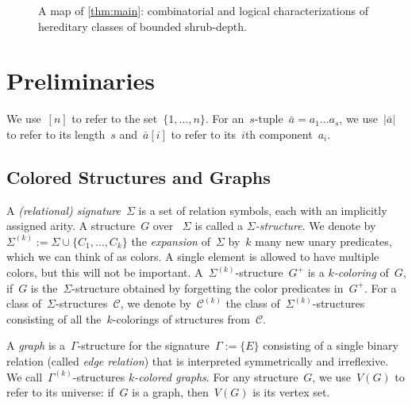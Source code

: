 \documentclass[11pt]{article}      \usepackage[margin=1in]{geometry}  \usepackage{microtype}
\theoremstyle{definition}
\newcommand{\CC}{\mathcal{C}}
\begin{document}
\begin{figure}[ht]
{      
}
\caption{A map of \cref{thm:main}: combinatorial and logical characterizations of hereditary classes of bounded shrub-depth.}
\label{fig:implications}
\end{figure}

  
\section{Preliminaries}\label{sec:prelims}
We use~$[n]$ to refer to the set~$\{ 1,\ldots,n \}$.
For an~$s$-tuple~$\bar a = a_1 \ldots a_s$, we use~$|\bar a|$ to refer to its length~$s$ and~$\bar a[i]$ to refer to its~$i$th component~$a_i$.

\subsection{Colored Structures and Graphs}
A \emph{(relational) signature}~$\Sigma$ is a set of relation symbols, each with an implicitly assigned arity.
A structure~$G$ over ~$\Sigma$ is called a \emph{$\Sigma$-structure}.
We denote by~$\Sigma^{(k)} := \Sigma \cup \{C_1,\ldots,C_k\}$ the \emph{expansion} of~$\Sigma$ by~$k$ many new unary predicates, which we can think of as colors.
A single element is allowed to have multiple colors, but this will not be important.
A~$\Sigma^{(k)}$-structure~$G^+$ is a \emph{$k$-coloring} of~$G$, if~$G$ is the~$\Sigma$-structure obtained by forgetting the color predicates in~$G^+$.
For a class of~$\Sigma$-structures~$\CC$, we denote by~$\CC^{(k)}$ the class of~$\Sigma^{(k)}$-structures consisting of all the~$k$-colorings of structures from~$\CC$.

A \emph{graph} is a~$\Gamma$-structure for the signature~$\Gamma := \{E\}$ consisting of a single binary relation (called \emph{edge relation}) that is interpreted symmetrically and irreflexive.
We call~$\Gamma^{(k)}$-structures \emph{$k$-colored graphs}.
For any structure~$G$, we use~$V(G)$ to refer to its universe: if~$G$ is a graph, then~$V(G)$ is its vertex set.
\end{document}
